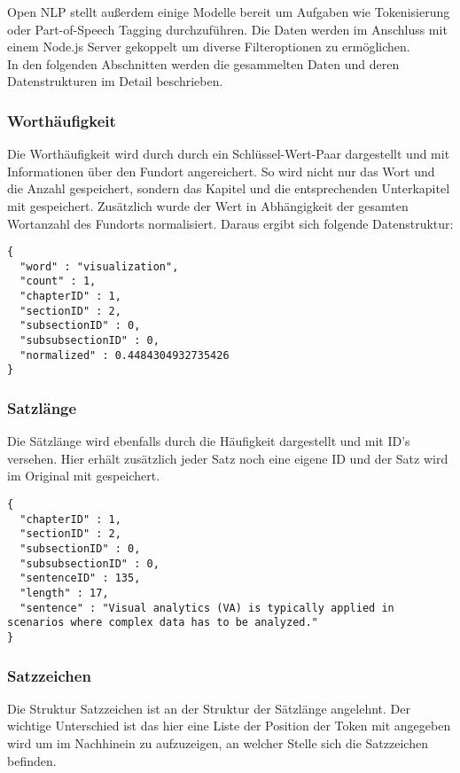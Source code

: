 Open NLP stellt außerdem einige Modelle bereit um Aufgaben wie Tokenisierung oder Part-of-Speech Tagging durchzuführen. Die Daten werden im Anschluss mit einem Node.js Server gekoppelt um diverse Filteroptionen zu ermöglichen.\\

In den folgenden Abschnitten werden die gesammelten Daten und deren Datenstrukturen im Detail beschrieben.

\subsubsection*{Worthäufigkeit}
Die Worthäufigkeit wird durch durch ein Schlüssel-Wert-Paar dargestellt und mit Informationen über den Fundort angereichert. So wird nicht nur das Wort und die Anzahl gespeichert, sondern das Kapitel und die entsprechenden Unterkapitel mit gespeichert. Zusätzlich wurde der Wert in Abhängigkeit der gesamten Wortanzahl des Fundorts normalisiert. Daraus ergibt sich folgende Datenstruktur:

\begin{lstlisting}
{
  "word" : "visualization",
  "count" : 1,
  "chapterID" : 1,
  "sectionID" : 2,
  "subsectionID" : 0,
  "subsubsectionID" : 0,
  "normalized" : 0.4484304932735426
}
\end{lstlisting}

\subsubsection*{Satzlänge}
Die Sätzlänge wird ebenfalls durch die Häufigkeit dargestellt und mit ID's versehen. Hier erhält zusätzlich jeder Satz noch eine eigene ID und der Satz wird im Original mit gespeichert.

\begin{lstlisting}
{
  "chapterID" : 1,
  "sectionID" : 2,
  "subsectionID" : 0,
  "subsubsectionID" : 0,
  "sentenceID" : 135,
  "length" : 17,
  "sentence" : "Visual analytics (VA) is typically applied in scenarios where complex data has to be analyzed."
}
\end{lstlisting}

\subsubsection*{Satzzeichen}
Die Struktur Satzzeichen ist an der Struktur der Sätzlänge angelehnt. Der wichtige Unterschied ist das hier eine Liste der Position der Token mit angegeben wird um im Nachhinein zu aufzuzeigen, an welcher Stelle sich die Satzzeichen befinden.

